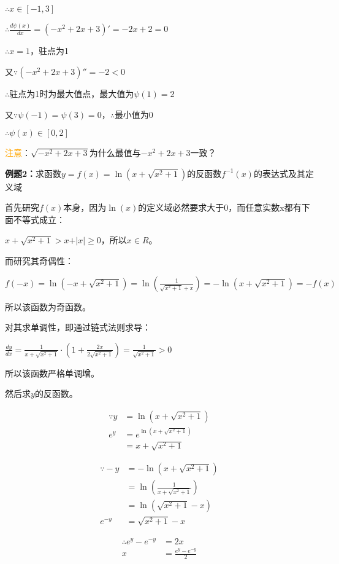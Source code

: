 \documentclass[UTF8, 12pt]{ctexart}
\begin{document}
$\therefore x\in[-1,3]$

$\therefore\frac{d\psi(x)}{dx}=(-x^2+2x+3)'=-2x+2=0$

$\therefore x=1$，驻点为1

又$\because(-x^2+2x+3)''=-2<0$

$\therefore$驻点为1时为最大值点，最大值为$\psi(1)=2$

又$\because\psi(-1)=\psi(3)=0$，$\therefore$最小值为0

$\therefore\psi(x)\in[0,2]$

\textcolor{orange}{注意}：$\sqrt{-x^2+2x+3}$为什么最值与$-x^2+2x+3$一致？

\textbf{例题2：}求函数$y=f(x)=\ln(x+\sqrt{x^2+1})$的反函数$f^{-1}(x)$的表达式及其定义域

首先研究$f(x)$本身，因为$\ln(x)$的定义域必然要求大于0，而任意实数x都有下面不等式成立：

$x+\sqrt{x^2+1}>x+\vert x\vert \geqslant 0$，所以$x\in R$。

而研究其奇偶性：

$f(-x)=\ln(-x+\sqrt{x^2+1})=\ln(\frac{1}{\sqrt{x^2+1}+x})=-\ln(x+\sqrt{x^2+1})=-f(x)$

所以该函数为奇函数。

对其求单调性，即通过链式法则求导：

$\frac{dy}{dx}=\frac{1}{x+\sqrt{x^2+1}}\cdot (1+\frac{2x}{2\sqrt{x^2+1}})=\frac{1}{\sqrt{x^2+1}}>0$

所以该函数严格单调增。

然后求$y$的反函数。

$$
\begin{aligned}
    \because y&=\ln(x+\sqrt{x^2+1}) \\
    e^y&=e^{\ln(x+\sqrt{x^2+1})} \\
    &=x+\sqrt{x^2+1}
\end{aligned}
$$

$$
\begin{aligned}
    \because -y&=-\ln(x+\sqrt{x^2+1}) \\
    &=\ln(\frac{1}{x+\sqrt{x^2+1}}) \\
    &=\ln(\sqrt{x^2+1}-x) \\
    e^{-y}&=\sqrt{x^2+1}-x
\end{aligned}
$$

$$
\begin{aligned}
    \therefore e^y-e^{-y}&=2x \\
    x&=\frac{e^y-e^{-y}}{2}
\end{aligned}
$$
\end{document}

